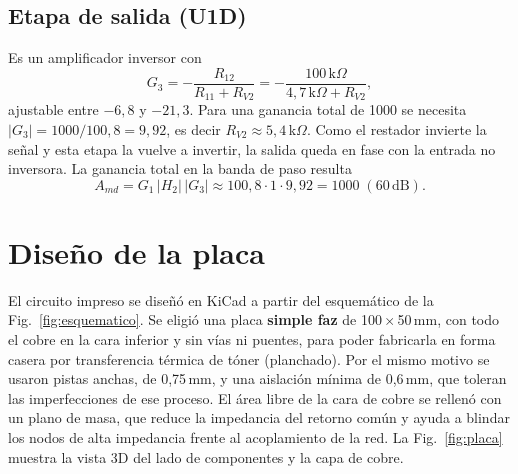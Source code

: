 \documentclass[journal,a4paper]{IEEEtran}
\begin{document}
\subsection{Etapa de salida (U1D)}
Es un amplificador inversor con
\begin{equation}
G_3 = -\frac{R_{12}}{R_{11}+R_{V2}} = -\frac{100\,\text{k}\Omega}{4{,}7\,\text{k}\Omega + R_{V2}},
\end{equation}
ajustable entre $-6{,}8$ y $-21{,}3$. Para una ganancia total de 1000 se necesita $|G_3| = 1000/100{,}8 = 9{,}92$, es decir $R_{V2}\approx 5{,}4$\,k$\Omega$. Como el restador invierte la señal y esta etapa la vuelve a invertir, la salida queda en fase con la entrada no inversora. La ganancia total en la banda de paso resulta
\begin{equation}
A_{md} = G_1\,|H_2|\,|G_3| \approx 100{,}8 \cdot 1 \cdot 9{,}92 = 1000 \;(60\,\text{dB}).
\end{equation}

\section{Diseño de la placa}

El circuito impreso se diseñó en KiCad a partir del esquemático de la Fig.~\ref{fig:esquematico}. Se eligió una placa \textbf{simple faz} de 100\,$\times$\,50\,mm, con todo el cobre en la cara inferior y sin vías ni puentes, para poder fabricarla en forma casera por transferencia térmica de tóner (planchado). Por el mismo motivo se usaron pistas anchas, de 0,75\,mm, y una aislación mínima de 0,6\,mm, que toleran las imperfecciones de ese proceso. El área libre de la cara de cobre se rellenó con un plano de masa, que reduce la impedancia del retorno común y ayuda a blindar los nodos de alta impedancia frente al acoplamiento de la red. La Fig.~\ref{fig:placa} muestra la vista 3D del lado de componentes y la capa de cobre.
\end{document}
